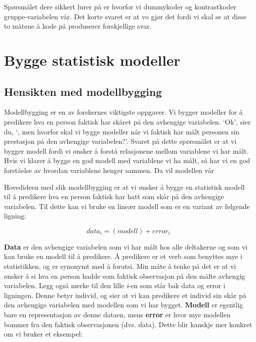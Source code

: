 \documentclass[
]{book}
\begin{document}
Spørsmålet dere sikkert lurer på er hvorfor vi dummykoder og kontrastkoder gruppe-variabelen vår. Det korte svaret er at vo gjør det fordi vi skal se at disse to måtene å kode på produserer forskjellige svar.

\hypertarget{bygge-statistisk-modeller}{%
\chapter{Bygge statistisk modeller}\label{bygge-statistisk-modeller}}

\hypertarget{hensikten-med-modellbygging}{%
\section{Hensikten med modellbygging}\label{hensikten-med-modellbygging}}

Modellbygging er en av forskernes viktigste oppgaver. Vi bygger modeller for å predikere hva en person faktisk har skåret på den avhengige variabelen. `Ok', sier du, `, men hvorfor skal vi bygge modeller når vi faktisk har målt personen sin prestasjon på den avhengige variabelen?'. Svaret på dette spørsmålet er at vi bygger modell fordi vi ønsker å forstå relasjonene mellom variablene vi har målt. Hvis vi klarer å bygge en god modell med variablene vi ha målt, så har vi en god forståelse av hvordan variablene henger sammen. Da vil modellen vår

Hovedideen med slik modellbygging er at vi ønsker å bygge en statistisk modell til å predikere hva en person faktisk har hatt som skår på den avhengige variabelen. Til dette kan vi bruke en lineær modell som er en variant av følgende ligning:

\[
data_i = (modell) + error_i
\]

\textbf{Data} er den avhengige variabelen som vi har målt hos alle deltakerne og som vi kan bruke en modell til å predikere. Å predikere er et verb som benyttes mye i statistikken, og er synonymt med å forutsi. Min måte å tenke på det er at vi ønsker å si hva en person hadde som faktisk observasjon på den målte avhengig variabelen. Legg også merke til den lille \emph{i}-en som står bak data og error i ligningen. Denne betyr individ, og sier at vi kan predikere et individ sin skår på den avhengige variabelen med modellen som vi har bygget. \textbf{Modell} er egentlig bare en representasjon av denne dataen, mens \textbf{error} er hvor mye modellen bommer fra den faktisk observasjonen (dvs. data). Dette blir kanskje mer konkret om vi bruker et eksempel:
\end{document}

